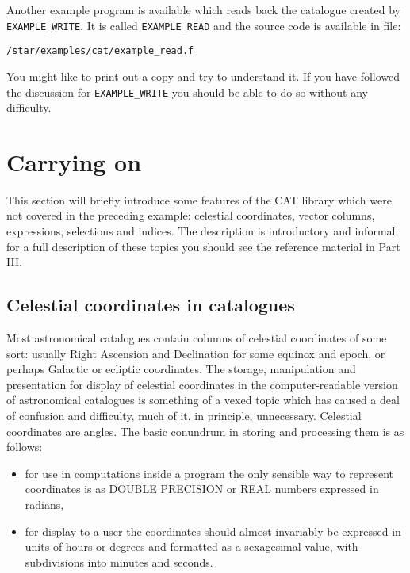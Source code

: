 Another example program is available which reads back the catalogue
created by {\tt EXAMPLE\_WRITE}. It is called {\tt EXAMPLE\_READ} 
and the source code is available in file:

\begin{center}
{\tt /star/examples/cat/example\_read.f}
\end{center}

You might like to print out a copy and try to understand it. If you
have followed the discussion for {\tt EXAMPLE\_WRITE} you should be
able to do so without any difficulty.


\section{Carrying on}

This section will briefly introduce some features of the CAT library
which were not covered in the preceding example: celestial coordinates,
vector columns, expressions, selections and indices. The description is 
introductory and informal; for a full description of these topics you 
should see the reference material in Part III.


\subsection{Celestial coordinates in catalogues}

Most astronomical catalogues contain columns of celestial 
coordinates of some sort: usually Right Ascension and 
Declination for some equinox and epoch, or perhaps Galactic or 
ecliptic coordinates. The storage, manipulation and presentation 
for display of celestial coordinates in the computer-readable 
version of astronomical catalogues is something of a vexed topic 
which has caused a deal of confusion and difficulty, much of it, 
in principle, unnecessary. Celestial coordinates are angles. The 
basic conundrum in storing and processing them is as follows:

\begin{itemize}

  \item for use in computations inside a program the only 
  sensible way to represent coordinates is as DOUBLE PRECISION or 
  REAL numbers expressed in radians,

  \item for display to a user the coordinates should almost 
   invariably be expressed in units of hours or degrees and 
   formatted as a sexagesimal value, with subdivisions into minutes 
   and seconds.

\end{itemize}

